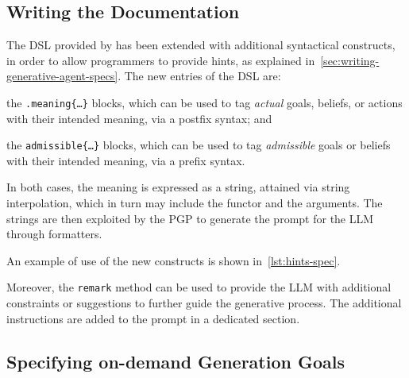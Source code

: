 \documentclass[12pt,a4paper,openright,twoside]{book}
\begin{document}


\subsection{Writing the Documentation}\label{sec:write-doc}

The \ac{DSL} provided by \jakta{} has been extended with additional syntactical constructs, in order to allow programmers to provide hints, as explained in~\cref{sec:writing-generative-agent-specs}.
%
The new entries of the \ac{DSL} are:
\begin{inlinelist}
    \item the \texttt{.meaning\{\ldots\}} blocks, which can be used to tag \emph{actual} goals, beliefs, or actions with their intended meaning, via a postfix syntax; and
    \item the \texttt{admissible\{\ldots\}} blocks, which can be used to tag \emph{admissible} goals or beliefs with their intended meaning, via a prefix syntax.
\end{inlinelist}
%
In both cases, the meaning is expressed as a string, attained via string interpolation, which in turn may include the functor and the arguments.
%
The strings are then exploited by the \ac{PGP} to generate the prompt for the \ac{LLM} through formatters.

An example of use of the new constructs is shown in~\cref{lst:hints-spec}.



Moreover, the \texttt{remark} method can be used to provide the LLM with additional constraints or suggestions to further guide the generative process.
%
The additional instructions are added to the prompt in a dedicated section.

\subsection{Specifying on-demand Generation Goals}\label{sec:on-demand-goals}
\end{document}
